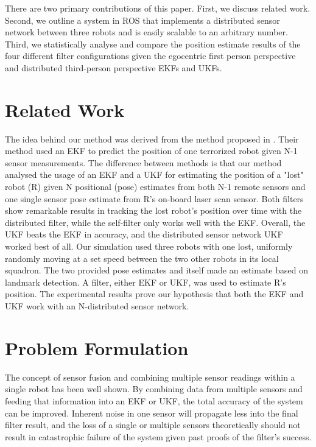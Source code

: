 \documentclass[conference]{IEEEtran} \usepackage[T1]{fontenc} \usepackage[backend=biber, style=ieee]{biblatex}
\begin{document}
There are two primary contributions of this paper. First, we discuss related work. Second, we outline a system in ROS that implements a distributed sensor network 
between three robots and is easily scalable to an arbitrary number. Third, we statistically analyse and compare the position estimate results of the four different 
filter configurations given the egocentric first person perspective and distributed third-person perspective EKFs and UKFs.

\section{Related Work} \label{Related Work}
The idea behind our method was derived from the method proposed in \cite{bezzo2014attack}. Their method used an EKF to predict the position
of one terrorized robot given N-1 sensor measurements. The difference between methods is that our method analysed the
usage of an EKF and a UKF for estimating the position of a "lost" robot (R) given N positional (pose) estimates from both N-1 remote
sensors and one single sensor pose estimate from R's on-board laser scan sensor. Both filters show remarkable results in tracking 
the lost robot's position over time with the distributed filter, while the self-filter only works well with the EKF. Overall, 
the UKF beats the EKF in accuracy, and the distributed sensor network UKF worked best of all. Our simulation used three robots 
with one lost, uniformly randomly moving at a set speed between the two other robots in its local squadron. The two provided 
pose estimates and itself made an estimate based on landmark detection. A filter, either EKF or UKF, was used to estimate R's 
position. The experimental results prove our hypothesis that both the EKF and UKF work with an N-distributed sensor network.


\section{Problem Formulation} \label{Problem Formulation}
The concept of sensor fusion and combining multiple sensor readings within a single robot has been well shown. By
combining data from multiple sensors and feeding that information into an EKF or UKF, the total accuracy of the system
can be improved. Inherent noise in one sensor will propagate less into the final filter result, and the loss of a single or
multiple sensors theoretically should not result in catastrophic failure of the system given past proofs of the filter's success.
\end{document}
